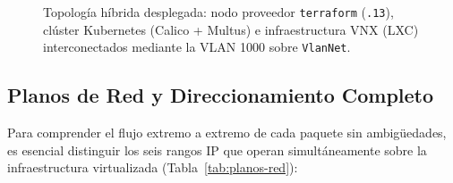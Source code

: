 \begin{figure}[H]
{%
}
\caption{Topología híbrida desplegada: nodo proveedor \texttt{terraform} (\texttt{.13}), clúster Kubernetes (Calico + Multus) e infraestructura VNX (LXC) interconectados mediante la VLAN 1000 sobre \texttt{VlanNet}.}
\label{fig:topologia-global}
\end{figure}

\subsection{Planos de Red y Direccionamiento Completo}

Para comprender el flujo extremo a extremo de cada paquete sin ambigüedades, es esencial distinguir los seis rangos IP que operan simultáneamente sobre la infraestructura virtualizada (Tabla~\ref{tab:planos-red}):

